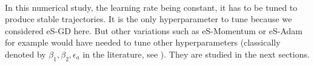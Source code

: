 \documentclass[article,authoryear,jmlmc]{beg_32}             %
\begin{document}



\ \\
In this numerical study, the learning rate being constant, it has to be tuned to produce stable trajectories. 
It is the only hyperparameter to tune because we considered eS-GD here. 
But other variations such as eS-Momentum or eS-Adam for example would have needed to tune other hyperparameters (classically denoted by $\beta_1,\beta_2, \epsilon_a$ in the literature, see
\cite{Bilel_thesis}). They are studied in the next sections. %
\end{document}
